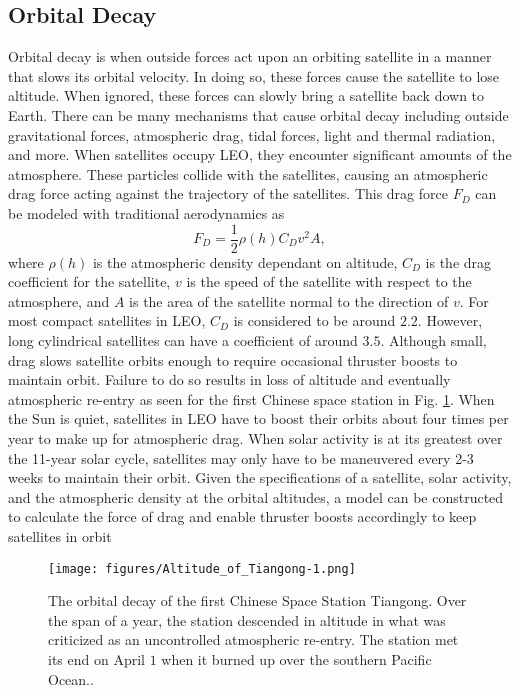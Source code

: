 \documentclass[10pt]{article}
\begin{document}
\subsection{Orbital Decay}
\label{appen_decay}

Orbital decay is when outside forces act upon an orbiting satellite in a manner that slows its orbital velocity. In doing so, these forces cause the satellite to lose altitude. When ignored, these forces can slowly bring a satellite back down to Earth. There can be many mechanisms that cause orbital decay including outside gravitational forces, atmospheric drag, tidal forces, light and thermal radiation, and more. When satellites occupy LEO, they encounter significant amounts of the atmosphere. These particles collide with the satellites, causing an atmospheric drag force acting against the trajectory of the satellites. This drag force $F_D$ can be modeled with traditional aerodynamics as
\begin{equation}
    F_D = \frac{1}{2}\rho(h) C_D v^2 A,
\end{equation}
where $\rho(h)$ is the atmospheric density dependant on altitude, $C_D$ is the drag coefficient for the satellite, $v$ is the speed of the satellite with respect to the atmosphere, and $A$ is the area of the satellite normal to the direction of $v$\cite{drag_numerical}. For most compact satellites in LEO, $C_D$ is considered to be around $2.2$\cite{drag_LEO}\cite{drag_thesis}. However, long cylindrical satellites can have a coefficient of around $3.5$\cite{satellite_drag}. Although small, drag slows satellite orbits enough to require occasional thruster boosts to maintain orbit. Failure to do so results in loss of altitude and eventually atmospheric re-entry as seen for the first Chinese space station in Fig. \ref{fig:tiangong_decay}. When the Sun is quiet, satellites in LEO have to boost their orbits about four times per year to make up for atmospheric drag. When solar activity is at its greatest over the 11-year solar cycle, satellites may only have to be maneuvered every 2-3 weeks to maintain their orbit. Given the specifications of a satellite, solar activity, and the atmospheric density at the orbital altitudes, a model can be constructed to calculate the force of drag and enable thruster boosts accordingly to keep satellites in orbit\cite{STORZ20052497}\cite{Low_Chia_2018}

\begin{figure}[h!]
\centering
\texttt{[image: figures/Altitude\_of\_Tiangong-1.png]}
\caption{The orbital decay of the first Chinese Space Station Tiangong. Over the span of a year, the station descended in altitude in what was criticized as an uncontrolled atmospheric re-entry. The station met its end on April $1$ when it burned up over the southern Pacific Ocean.\cite{tiangong}.}
\label{fig:tiangong_decay}
\end{figure}
\end{document}
